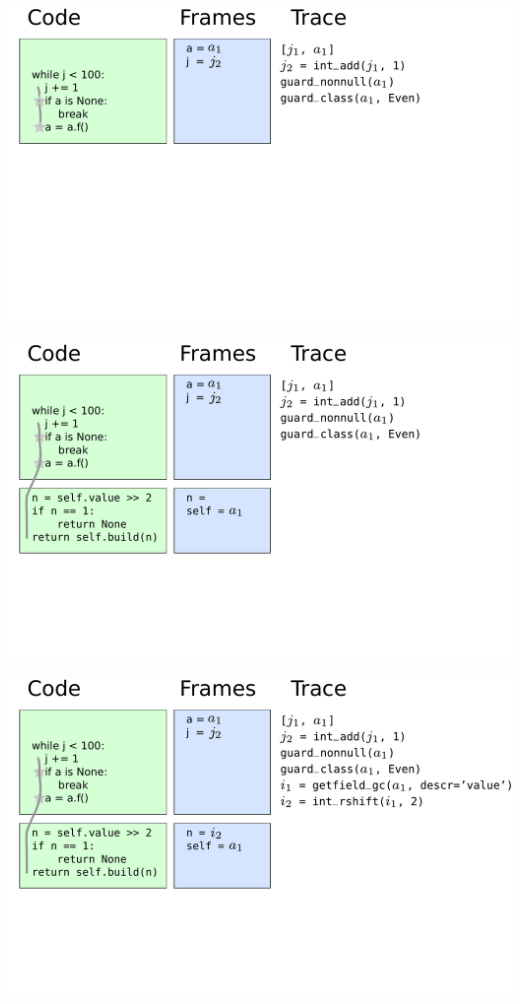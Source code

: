 \documentclass[utf8x]{beamer}
\begin{document}
\begin{frame}
  \includegraphics[scale=0.4]{figures/loop04}
\end{frame}

\begin{frame}
  \includegraphics[scale=0.4]{figures/loop05}
\end{frame}

\begin{frame}
  \includegraphics[scale=0.4]{figures/loop06}
\end{frame}
\end{document}
